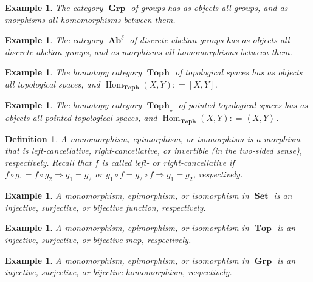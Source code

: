 \documentclass[sort&compress]{elsarticle}
\theoremstyle{theoremstyle}
\theoremstyle{framedtheoremstyle}
\theoremstyle{definitionstyle}
\newtheorem{dfn}[nul]{Definition}%
\theoremstyle{definitionstyle}
\theoremstyle{definitionstyle}
\theoremstyle{definitionstyle}
\newtheorem{exm}[nul]{Example}
\theoremstyle{nameddefinitionstyle}
\theoremstyle{framednameddefinitionstyle}
\theoremstyle{proofstyle}
\theoremstyle{definitionstyle}
\newcommand{\Set}{\operatorname{\mathbf{Set}}}
\newcommand{\Top}{\operatorname{\mathbf{Top}}}
\newcommand{\Toph}{\operatorname{\mathbf{Toph}}}
\newcommand{\Grp}{\operatorname{\mathbf{Grp}}}
\newcommand{\Ab}{\operatorname{\mathbf{Ab}}}
\DeclareMathOperator{\Hom}{Hom}
\newcommand{\coloneq}{\mathrel{\mathop:}=}
\newcommand{\angles}[1]{\left\langle #1 \right\rangle}
\newcommand{\brackets}[1]{\left[ #1 \right]}
\begin{document}
\begin{appendices}
\begin{exm}
The category $\Grp$ of groups has as objects all groups, and as morphisms all homomorphisms between them. %
\end{exm}

\begin{exm}
The category $\Ab^\delta$ of discrete abelian groups has as objects all discrete abelian groups, and as morphisms all homomorphisms between them. %
\end{exm}

\begin{exm}
The homotopy category $\Toph$ of topological spaces has as objects all topological spaces, and $\Hom_{\Toph}(X, Y) \coloneq \brackets{X, Y}$. %
\end{exm}

\begin{exm}
The homotopy category $\Toph_\star$ of pointed topological spaces has as objects all pointed topological spaces, and $\Hom_{\Toph}(X, Y) \coloneq \angles{X, Y}$. %
\end{exm}

\begin{dfn}
A monomorphism, epimorphism, or isomorphism is a morphism that is left-cancellative, right-cancellative, or invertible (in the two-sided sense), respectively. Recall that $f$ is called left- or right-cancellative if $f\circ g_1 = f\circ g_2 \Rightarrow g_1 = g_2$ or $g_1 \circ f = g_2 \circ f \Rightarrow g_1 = g_2$, respectively.
\end{dfn}

\begin{exm}
A monomorphism, epimorphism, or isomorphism in $\Set$ is an injective, surjective, or bijective function, respectively.
\end{exm}

\begin{exm}
A monomorphism, epimorphism, or isomorphism in $\Top$ is an injective, surjective, or bijective map, respectively.
\end{exm}

\begin{exm}
A monomorphism, epimorphism, or isomorphism in $\Grp$ is an injective, surjective, or bijective homomorphism, respectively.
\end{exm}


\end{appendices}
\end{document}
